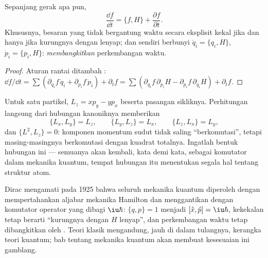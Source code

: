 \begin{theorem}\label{thm:b3:hamiltonian-mechanics:evolution}
Sepanjang gerak apa pun,
\[
\frac{\dd f}{\dd t} = \{f, H\} + \frac{\partial f}{\partial t} .
\]
Khususnya, besaran yang tidak bergantung waktu secara eksplisit kekal
jika dan hanya jika kurungnya dengan  lenyap; dan  sendiri berbunyi $\dot q_i = \{q_i, H\}$, $\dot p_i
= \{p_i, H\}$:  \emph{membangkitkan} perkembangan waktu.
\end{theorem}

\begin{proof}
Aturan rantai ditambah : $\dd f/\dd t = \sum(
\partial_{q_i}f\,\dot q_i + \partial_{p_i}f\,\dot p_i) + \partial_tf =
\sum(\partial_{q_i}f\,\partial_{p_i}H - \partial_{p_i}f\,
\partial_{q_i}H) + \partial_tf$.
\end{proof}

\begin{example}\label{ex:b3:hamiltonian-mechanics:brackets}
Untuk satu partikel, $L_z = xp_y - yp_x$ beserta pasangan sikliknya.
Perhitungan langsung dari hubungan kanoniknya memberikan
\[
\{L_x, L_y\} = L_z , \qquad
\{L_y, L_z\} = L_x , \qquad
\{L_z, L_x\} = L_y ,
\]
dan $\{L^2, L_z\} = 0$: komponen momentum sudut tidak saling
``berkomutasi'', tetapi masing-masingnya berkomutasi dengan kuadrat
totalnya. Ingatlah bentuk hubungan ini --- semuanya akan kembali, kata
demi kata, sebagai komutator dalam mekanika kuantum, tempat hubungan itu
menentukan segala hal tentang struktur atom.
\end{example}

\begin{remark}\label{rem:b3:hamiltonian-mechanics:doorway}
Dirac mengamati pada 1925 bahwa seluruh mekanika kuantum diperoleh
dengan mempertahankan aljabar mekanika Hamilton dan menggantikan  dengan komutator operator yang dibagi
$\iu\hbar$: $\{q, p\} = 1$ menjadi $[\hat x, \hat p] = \iu\hbar$,
kekekalan tetap berarti ``kurungnya dengan $H$ lenyap'', dan
perkembangan waktu tetap dibangkitkan oleh . Teori klasik
mengandung, jauh di dalam tulangnya, kerangka teori kuantum; bab tentang
mekanika kuantum akan membuat kesesuaian ini gamblang.
\end{remark}

